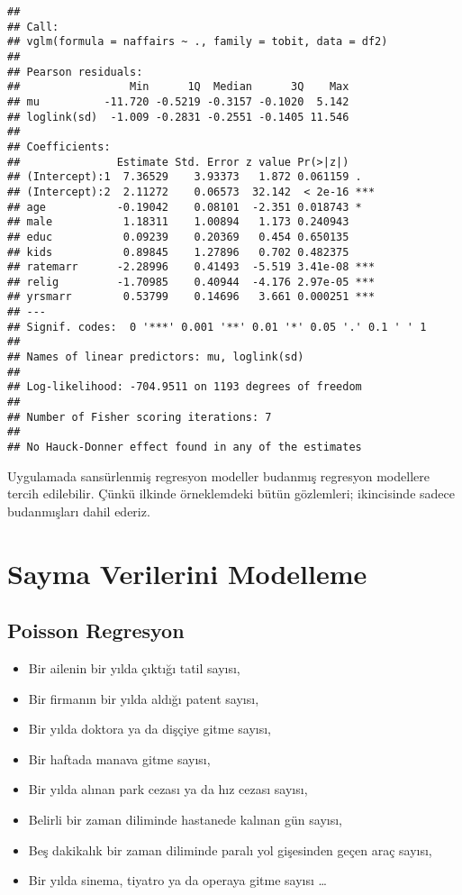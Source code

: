 \documentclass[
]{book}
\begin{document}
\begin{verbatim}
## 
## Call:
## vglm(formula = naffairs ~ ., family = tobit, data = df2)
## 
## Pearson residuals:
##                 Min      1Q  Median      3Q    Max
## mu          -11.720 -0.5219 -0.3157 -0.1020  5.142
## loglink(sd)  -1.009 -0.2831 -0.2551 -0.1405 11.546
## 
## Coefficients: 
##               Estimate Std. Error z value Pr(>|z|)    
## (Intercept):1  7.36529    3.93373   1.872 0.061159 .  
## (Intercept):2  2.11272    0.06573  32.142  < 2e-16 ***
## age           -0.19042    0.08101  -2.351 0.018743 *  
## male           1.18311    1.00894   1.173 0.240943    
## educ           0.09239    0.20369   0.454 0.650135    
## kids           0.89845    1.27896   0.702 0.482375    
## ratemarr      -2.28996    0.41493  -5.519 3.41e-08 ***
## relig         -1.70985    0.40944  -4.176 2.97e-05 ***
## yrsmarr        0.53799    0.14696   3.661 0.000251 ***
## ---
## Signif. codes:  0 '***' 0.001 '**' 0.01 '*' 0.05 '.' 0.1 ' ' 1
## 
## Names of linear predictors: mu, loglink(sd)
## 
## Log-likelihood: -704.9511 on 1193 degrees of freedom
## 
## Number of Fisher scoring iterations: 7 
## 
## No Hauck-Donner effect found in any of the estimates
\end{verbatim}

Uygulamada sansürlenmiş regresyon modeller budanmış regresyon modellere tercih edilebilir. Çünkü ilkinde örneklemdeki bütün gözlemleri; ikincisinde sadece budanmışları dahil ederiz.

\hypertarget{sayma-verilerini-modelleme}{%
\chapter{Sayma Verilerini Modelleme}\label{sayma-verilerini-modelleme}}

\hypertarget{poisson-regresyon}{%
\section{Poisson Regresyon}\label{poisson-regresyon}}

\begin{itemize}
\item
  Bir ailenin bir yılda çıktığı tatil sayısı,
\item
  Bir firmanın bir yılda aldığı patent sayısı,
\item
  Bir yılda doktora ya da dişçiye gitme sayısı,
\item
  Bir haftada manava gitme sayısı,
\item
  Bir yılda alınan park cezası ya da hız cezası sayısı,
\item
  Belirli bir zaman diliminde hastanede kalınan gün sayısı,
\item
  Beş dakikalık bir zaman diliminde paralı yol gişesinden geçen araç sayısı,
\item
  Bir yılda sinema, tiyatro ya da operaya gitme sayısı \ldots{}
\end{itemize}
\end{document}
